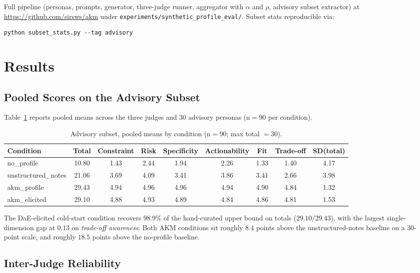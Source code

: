 \documentclass[11pt]{article}
\begin{document}
Full pipeline (personas, prompts, generator, three-judge runner, aggregator with $\alpha$ and $\rho$, advisory subset extractor) at \url{https://github.com/sirsws/akm} under \texttt{experiments/synthetic\_profile\_eval/}. Subset stats reproducible via:

\begin{verbatim}
python subset_stats.py --tag advisory
\end{verbatim}

\section{Results}
\label{sec:results}

\subsection{Pooled Scores on the Advisory Subset}

Table~\ref{tab:advisory_pooled} reports pooled means across the three judges and 30 advisory personas (n${=}$90 per condition).

\begin{table}[h]
\centering
\caption{Advisory subset, pooled means by condition (n${=}$90; max total ${=}30$).}
\label{tab:advisory_pooled}
\small
\begin{tabular}{lcccccccc}
\toprule
Condition & Total & Constraint & Risk & Specificity & Actionability & Fit & Trade-off & SD(total) \\
\midrule
no\_profile          & 10.80 & 1.43 & 2.44 & 1.94 & 2.26 & 1.33 & 1.40 & 4.17 \\
unstructured\_notes  & 21.06 & 3.69 & 4.09 & 3.41 & 3.86 & 3.41 & 2.66 & 3.98 \\
akm\_profile         & 29.43 & 4.94 & 4.96 & 4.96 & 4.94 & 4.90 & 4.84 & 1.32 \\
akm\_elicited        & 29.10 & 4.88 & 4.93 & 4.89 & 4.84 & 4.86 & 4.81 & 1.53 \\
\bottomrule
\end{tabular}
\end{table}

The DaE-elicited cold-start condition recovers $98.9\%$ of the hand-curated upper bound on totals ($29.10/29.43$), with the largest single-dimension gap at $0.13$ on \emph{trade-off awareness}. Both AKM conditions sit roughly $8.4$ points above the unstructured-notes baseline on a 30-point scale, and roughly $18.5$ points above the no-profile baseline.

\subsection{Inter-Judge Reliability}
\end{document}
